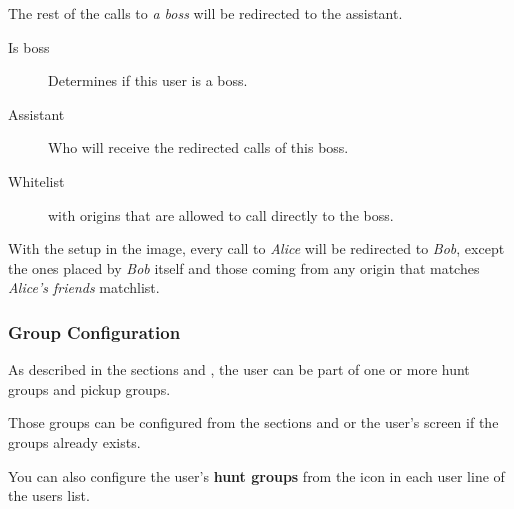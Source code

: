\documentclass[letterpaper,10pt,spanish]{sphinxmanual}
\begin{document}
The rest of the calls to \emph{a boss} will be redirected to the assistant.
\begin{description}
\item[{Is boss}] \leavevmode{}\label{administration_portal/client/vpbx/users:term-is-boss}
Determines if this user is a boss.

\item[{Assistant}] \leavevmode{}\label{administration_portal/client/vpbx/users:term-assistant}
Who will receive the redirected calls of this boss.

\item[{Whitelist}] \leavevmode{}\label{administration_portal/client/vpbx/users:term-whitelist}
{\hyperref[administration_portal/client/vpbx/routing_tools/match_lists:match\string-lists]{}} with origins that are allowed to call directly to
the boss.

\end{description}

With the setup in the image, every call to \emph{Alice} will be redirected to \emph{Bob},
except the ones placed by \emph{Bob} itself and those coming from any origin that matches
\emph{Alice's friends} matchlist.


\subsubsection{Group Configuration}
\label{administration_portal/client/vpbx/users:group-configuration}
As described in the sections {\hyperref[administration_portal/client/vpbx/routing_endpoints/hunt_groups:huntgroups]{}} and {\hyperref[administration_portal/client/vpbx/user_configuration/pick_up_groups:capture\string-groups]{}}, the
user can be part of one or more hunt groups and pickup groups.

Those groups can be configured from the sections {\hyperref[administration_portal/client/vpbx/routing_endpoints/hunt_groups:huntgroups]{}} and
{\hyperref[administration_portal/client/vpbx/user_configuration/pick_up_groups:capture\string-groups]{}} or the user's screen if the groups already exists.

You can also configure the user's \textbf{hunt groups} from the icon in each user
line of the users list.
\end{document}
